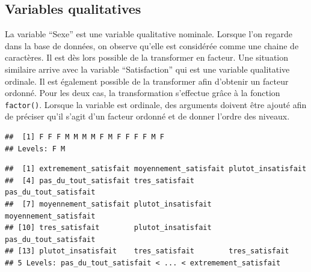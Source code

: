 \documentclass[
]{book}
\newenvironment{Shaded}{\begin{snugshade}}{\end{snugshade}}
\newcommand{\AttributeTok}[1]{\textcolor[rgb]{0.13,0.29,0.53}{#1}}
\newcommand{\ConstantTok}[1]{\textcolor[rgb]{0.56,0.35,0.01}{#1}}
\newcommand{\FunctionTok}[1]{\textcolor[rgb]{0.13,0.29,0.53}{\textbf{#1}}}
\newcommand{\NormalTok}[1]{#1}
\newcommand{\OtherTok}[1]{\textcolor[rgb]{0.56,0.35,0.01}{#1}}
\newcommand{\SpecialCharTok}[1]{\textcolor[rgb]{0.81,0.36,0.00}{\textbf{#1}}}
\newcommand{\StringTok}[1]{\textcolor[rgb]{0.31,0.60,0.02}{#1}}
\begin{document}
\subsection{Variables qualitatives}\label{variables-qualitatives}

La variable ``Sexe'' est une variable qualitative nominale. Lorsque l'on regarde dans la base de données, on observe qu'elle est considérée comme une chaine de caractères. Il est dès lors possible de la transformer en facteur. Une situation similaire arrive avec la variable ``Satisfaction'' qui est une variable qualitative ordinale. Il est également possible de la transformer afin d'obtenir un facteur ordonné. Pour les deux cas, la transformation s'effectue grâce à la fonction \texttt{factor()}. Lorsque la variable est ordinale, des arguments doivent être ajouté afin de préciser qu'il s'agit d'un facteur ordonné et de donner l'ordre des niveaux.

\begin{Shaded}
\end{Shaded}

\begin{verbatim}
##  [1] F F F M M M M F M F F F F M F
## Levels: F M
\end{verbatim}

\begin{Shaded}
\end{Shaded}

\begin{verbatim}
##  [1] extremement_satisfait moyennement_satisfait plutot_insatisfait   
##  [4] pas_du_tout_satisfait tres_satisfait        pas_du_tout_satisfait
##  [7] moyennement_satisfait plutot_insatisfait    moyennement_satisfait
## [10] tres_satisfait        plutot_insatisfait    pas_du_tout_satisfait
## [13] plutot_insatisfait    tres_satisfait        tres_satisfait       
## 5 Levels: pas_du_tout_satisfait < ... < extremement_satisfait
\end{verbatim}
\end{document}

